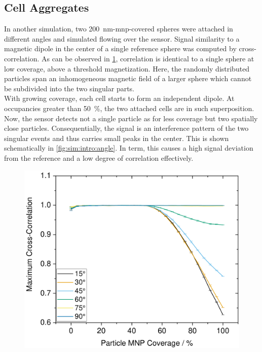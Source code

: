 \subsection{Cell Aggregates}
In another simulation, two \SI{200}{\nano\meter}-\gls{mnp}-covered spheres were attached in different angles and simulated flowing over the sensor. Signal similarity to a magnetic dipole in the center of a single reference sphere was computed by cross-correlation. As can be observed in \cref{fig:sim:aggregates}, correlation is identical to a single sphere at low coverage, above a threshold magnetization. Here, the randomly distributed particles span an inhomogeneous magnetic field of a larger sphere which cannot be subdivided into the two singular parts.\\
With growing coverage, each cell starts to form an independent dipole. At occupancies greater than \SI{50}{\percent}, the two attached cells are in such superposition. Now, the sensor detects not a single particle as for less coverage but two spatially close particles. Consequentially, the signal is an interference pattern of the two singular events and thus carries small peaks in the center. This is shown schematically in \cref{fig:sim:intro:angle}. In term, this causes a high signal deviation from the reference and a low degree of correlation effectively.
\clearpage
\begin{figure}[h!]
	\centering
	\includegraphics[width=.7\linewidth]{Ressources/Simulation/Aggregates}	
	\label{fig:sim:aggregates}
\end{figure}
